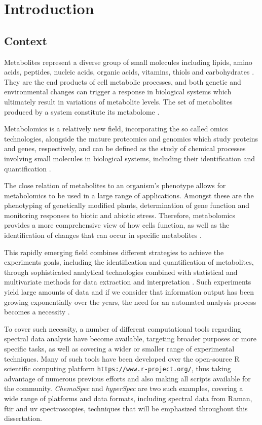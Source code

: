 \chapter{Introduction}
\section{Context}

Metabolites represent a diverse group of small molecules including lipids, amino acids, peptides, nucleic acids, organic acids, vitamins, thiols and carbohydrates \citep{zhang2012modern}. They are the end products of cell metabolic processes, and both genetic and environmental changes can trigger a response in biological systems which ultimately result in variations of metabolite levels. The set of metabolites produced by a system constitute its metabolome \citep{fiehn2002metabolomics}.

Metabolomics is a relatively new field, incorporating the so called omics technologies, alongside the mature proteomics and genomics which study proteins and genes, respectively,  and can be defined as the study of chemical processes involving small molecules in biological systems, including their identification and quantification \citep{daviss2005growing}.

The close relation of metabolites to an organism's phenotype \citep{fiehn2002metabolomics} allows for metabolomics to be used in a large range of applications. Amongst these are the phenotyping of genetically modified plants, determination of gene function and monitoring responses to biotic and abiotic stress. Therefore, metabolomics provides a more comprehensive view of how cells function, as well as the identification of changes that can occur in specific metabolites \citep{roessner2009metabolomics}.

This rapidly emerging field combines different strategies to achieve the experiments goals, including the identification and quantification of metabolites, through sophisticated analytical technologies combined with statistical and multivariate methods for data extraction and interpretation \citep{roessner2009metabolomics}. Such experiments yield large amounts of data and if we consider that information output has been growing exponentially over the years, the need for an automated analysis process becomes a necessity \citep{larsen2010rate}.

To cover such necessity, a number of different computational tools regarding spectral data analysis have become available, targeting broader purposes or more specific tasks, as well
as covering a wider or smaller range of experimental techniques. Many of such tools have been developed over the open-source R scientific computing platform \href{https://www.r-project.org/}{\nolinkurl{https://www.r-project.org/}}, thus taking advantage of numerous previous efforts and also making all scripts available for the community. \textit{ChemoSpec} and \textit{hyperSpec} are two such examples, covering a wide range of platforms and data formats, including spectral data from Raman, \gls{ftir} and \gls{uv} spectroscopies, techniques that will be emphasized throughout this dissertation. 

